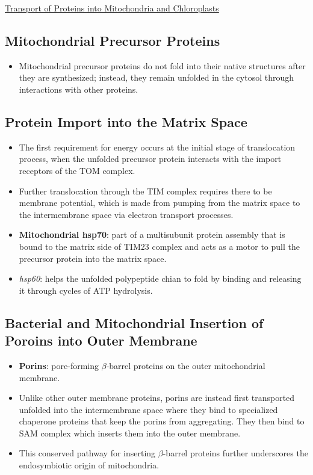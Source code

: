 \documentclass[12pt,letterpaper]{article}
\begin{document}
\begin{secbox}{\hyperlink{12}{Transport of Proteins into Mitochondria and Chloroplasts}}
{    \hypertarget{12.3.2}{\subsection*{Mitochondrial Precursor Proteins}}
    \begin{itemize}
        \item Mitochondrial precursor proteins do not fold into their native structures after they are synthesized; instead, they remain unfolded in the cytosol through interactions with other proteins.
    \end{itemize}

    \hypertarget{12.3.3}{\subsection*{Protein Import into the Matrix Space}}
    \begin{itemize}
        \item The first requirement for energy occurs at the initial stage of translocation process, when the unfolded precursor protein interacts with the import receptors of the TOM complex.
        \item Further translocation through the TIM complex requires there to be membrane potential, which is made from pumping  from the matrix space to the intermembrane space via electron transport processes.
        \item \textbf{Mitochondrial hsp70}: part of a multisubunit protein assembly that is bound to the matrix side of TIM23 complex and acts as a motor to pull the precursor protein into the matrix space.
        \item \textit{hsp60}: helps the unfolded polypeptide chian to fold by binding and releasing it through cycles of ATP hydrolysis.
    \end{itemize}

    \hypertarget{12.3.4}{\subsection*{Bacterial and Mitochondrial Insertion of Poroins into Outer Membrane}}
    \begin{itemize}
        \item \textbf{Porins}: pore-forming \(\beta\)-barrel proteins on the outer mitochondrial membrane.
        \item Unlike other outer membrane proteins, porins are instead first transported unfolded into the intermembrane space where they bind to specialized chaperone proteins that keep the porins from aggregating. They then bind to SAM complex which inserts them into the outer membrane.
        \item This conserved pathway for inserting \(\beta\)-barrel proteins further underscores the endosymbiotic origin of mitochondria.
    \end{itemize}
    
}
\end{secbox}
\end{document}
